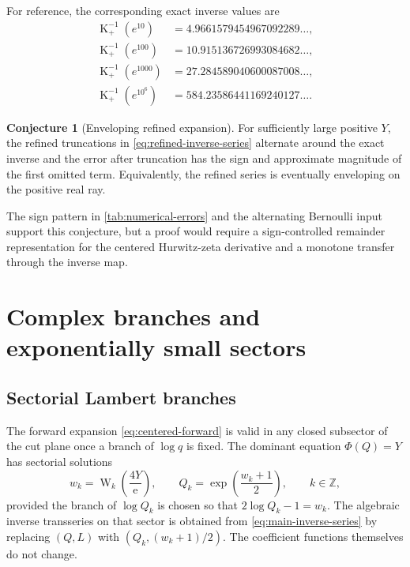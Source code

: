 \documentclass[11pt,oneside]{article}
\theoremstyle{plain}
\theoremstyle{definition}
\newtheorem{conjecture}[theorem]{Conjecture}
\theoremstyle{remark}
\newcommand{\Kfun}{\operatorname{K}}
\newcommand{\W}{\operatorname{W}}
\newcommand{\e}{\mathrm{e}}
\begin{document}
For reference, the corresponding exact inverse values are
\begin{align*}
 \Kfun_+^{-1}(e^{10})&=4.9661579454967092289\ldots,\\
 \Kfun_+^{-1}(e^{100})&=10.915136726993084682\ldots,\\
 \Kfun_+^{-1}(e^{1000})&=27.284589040600087008\ldots,\\
 \Kfun_+^{-1}(e^{10^6})&=584.23586441169240127\ldots.
\end{align*}

\begin{conjecture}[Enveloping refined expansion]
\label{conj:enveloping}
For sufficiently large positive \(Y\), the refined truncations in
\eqref{eq:refined-inverse-series} alternate around the exact inverse and the
error after truncation has the sign and approximate magnitude of the first
omitted term.  Equivalently, the refined series is eventually enveloping on the
positive real ray.
\end{conjecture}

The sign pattern in \cref{tab:numerical-errors} and the alternating Bernoulli
input support this conjecture, but a proof would require a sign-controlled
remainder representation for the centered Hurwitz-zeta derivative and a
monotone transfer through the inverse map.

\section{Complex branches and exponentially small sectors}
\label{sec:complex}

\subsection{Sectorial Lambert branches}

The forward expansion \eqref{eq:centered-forward} is valid in any closed
subsector of the cut plane once a branch of \(\log q\) is fixed.  The dominant
equation \(\Phi(Q)=Y\) has sectorial solutions
\begin{equation}
 w_k=\W_k\!\left(\frac{4Y}{\e}\right),
 \qquad
 Q_k=\exp\!\left(\frac{w_k+1}{2}\right),
 \qquad k\in\mathbb{Z},
 \label{eq:complex-Qk}
\end{equation}
provided the branch of \(\log Q_k\) is chosen so that
\(2\log Q_k-1=w_k\).  The algebraic inverse transseries on that sector is
obtained from \eqref{eq:main-inverse-series} by replacing \((Q,L)\) with
\((Q_k,(w_k+1)/2)\).  The coefficient functions themselves do not change.
\end{document}
